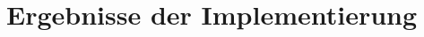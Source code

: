\chapter{Ergebnisse der Implementierung}


% 
%
\seAppendix{}

%
%
%
%
\newpage
\sePrintGlossary{}


%
%
\sePrintBibliography{}

%


%
%


%
%
%

%
% 


%
%
%
\seEhrenwoertlicheErklaerung[\seThemaWaArbeit{}]


